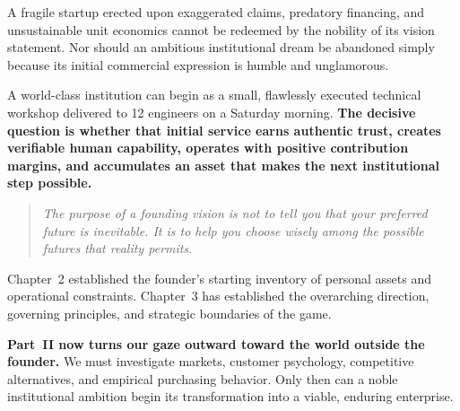 A fragile startup erected upon exaggerated claims, predatory financing, and unsustainable unit economics cannot be redeemed by the nobility of its vision statement. Nor should an ambitious institutional dream be abandoned simply because its initial commercial expression is humble and unglamorous.

A world-class institution can begin as a small, flawlessly executed technical workshop delivered to 12 engineers on a Saturday morning. \textbf{The decisive question is whether that initial service earns authentic trust, creates verifiable human capability, operates with positive contribution margins, and accumulates an asset that makes the next institutional step possible.}

\begin{quote}
\itshape
The purpose of a founding vision is not to tell you that your preferred future is inevitable. It is to help you choose wisely among the possible futures that reality permits.
\end{quote}

Chapter~2 established the founder's starting inventory of personal assets and operational constraints. Chapter~3 has established the overarching direction, governing principles, and strategic boundaries of the game.

\textbf{Part~II now turns our gaze outward toward the world outside the founder.} We must investigate markets, customer psychology, competitive alternatives, and empirical purchasing behavior. Only then can a noble institutional ambition begin its transformation into a viable, enduring enterprise.
